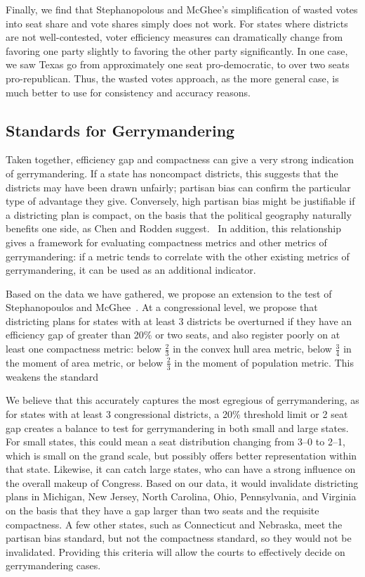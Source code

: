 \documentclass[12pt]{article}
\begin{document}
  Finally, we find that Stephanopolous and McGhee's simplification of wasted votes into seat share and vote shares simply does not work.  For states where districts are not well-contested, voter efficiency measures can dramatically change from favoring one party slightly to favoring the other party significantly.  In one case, we saw Texas go from approximately one seat pro-democratic, to over two seats pro-republican.  Thus, the wasted votes approach, as the more general case, is much better to use for consistency and accuracy reasons.
  
  \subsection{Standards for Gerrymandering}

  Taken together, efficiency gap and compactness can give a very strong indication of gerrymandering.  If a state has noncompact districts, this suggests that the districts may have been drawn unfairly; partisan bias can confirm the particular type of advantage they give.  Conversely, high partisan bias might be justifiable if a districting plan is compact, on the basis that the political geography naturally benefits one side, as Chen and Rodden suggest.~\cite{chenrodden}  In addition, this relationship gives a framework for evaluating compactness metrics and other metrics of gerrymandering: if a metric tends to correlate with the other existing metrics of gerrymandering, it can be used as an additional indicator.

  Based on the data we have gathered, we propose an extension to the test of Stephanopoulos and McGhee~\cite{stephanopoulos}.  At a congressional level, we propose that districting plans for states with at least 3 districts be overturned if they have an efficiency gap of greater than 20\% or two seats, and also register poorly on at least one compactness metric: below $\frac23$ in the convex hull area metric, below $\frac34$ in the moment of area metric, or below $\frac23$ in the moment of population metric.  This weakens the standard 

  We believe that this accurately captures the most egregious of gerrymandering, as for states with at least 3 congressional districts, a 20\% threshold limit or 2 seat gap creates a balance to test for gerrymandering in both small and large states.  For small states, this could mean a seat distribution changing from 3--0 to 2--1, which is small on the grand scale, but possibly offers better representation within that state. Likewise, it can catch large states, who can have a strong influence on the overall makeup of Congress.  Based on our data, it would invalidate districting plans in Michigan, New Jersey, North Carolina, Ohio, Pennsylvania, and Virginia on the basis that they have a gap larger than two seats and the requisite compactness.  A few other states, such as Connecticut and Nebraska, meet the partisan bias standard, but not the compactness standard, so they would not be invalidated.  Providing this criteria will allow the courts to effectively decide on gerrymandering cases.
\end{document}
